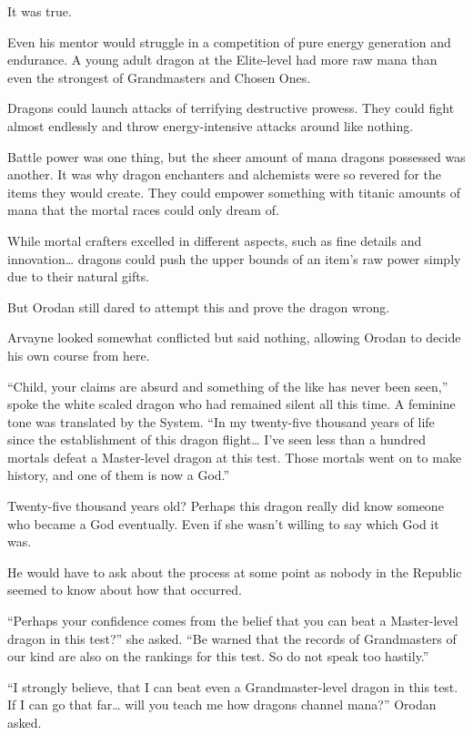 \documentclass[a4paper,10pt]{book}
\begin{document}
It was true.\par
Even his mentor would struggle in a competition of pure energy generation and endurance. A young adult dragon at the Elite-level had more raw mana than even the strongest of Grandmasters and Chosen Ones.\par
Dragons could launch attacks of terrifying destructive prowess. They could fight almost endlessly and throw energy-intensive attacks around like nothing.\par
Battle power was one thing, but the sheer amount of mana dragons possessed was another. It was why dragon enchanters and alchemists were so revered for the items they would create. They could empower something with titanic amounts of mana that the mortal races could only dream of.\par
While mortal crafters excelled in different aspects, such as fine details and innovation… dragons could push the upper bounds of an item’s raw power simply due to their natural gifts.\par
But Orodan still dared to attempt this and prove the dragon wrong.\par
Arvayne looked somewhat conflicted but said nothing, allowing Orodan to decide his own course from here.\par
“Child, your claims are absurd and something of the like has never been seen,” spoke the white scaled dragon who had remained silent all this time. A feminine tone was translated by the System. “In my twenty-five thousand years of life since the establishment of this dragon flight… I’ve seen less than a hundred mortals defeat a Master-level dragon at this test. Those mortals went on to make history, and one of them is now a God.”\par
Twenty-five thousand years old? Perhaps this dragon really did know someone who became a God eventually. Even if she wasn’t willing to say which God it was.\par
He would have to ask about the process at some point as nobody in the Republic seemed to know about how that occurred.\par
“Perhaps your confidence comes from the belief that you can beat a Master-level dragon in this test?” she asked. “Be warned that the records of Grandmasters of our kind are also on the rankings for this test. So do not speak too hastily.”\par
“I strongly believe, that I can beat even a Grandmaster-level dragon in this test. If I can go that far… will you teach me how dragons channel mana?” Orodan asked.\par
\end{document}

